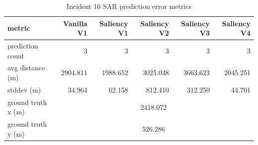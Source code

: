 \begin{table}[ht]
\centering
\caption{Incident 16 SAR prediction error metrics}
\label{tab:sar-incident-16}
\begin{tabular}{lrrrrr}
\hline
metric & Vanilla V1 & Saliency V1 & Saliency V2 & Saliency V3 & Saliency V4 \\
\hline
prediction count & 3 & 3 & 3 & 3 & 3 \\
avg distance (m) & 2904.811 & 1988.652 & 3025.038 & 3663.623 & 2045.251 \\
stddev (m) & 34.964 & 62.158 & 812.410 & 312.250 & 44.701 \\
ground truth x (m) & \multicolumn{5}{c}{2418.072} \\
ground truth y (m) & \multicolumn{5}{c}{526.286} \\
\hline
\end{tabular}
\end{table}
